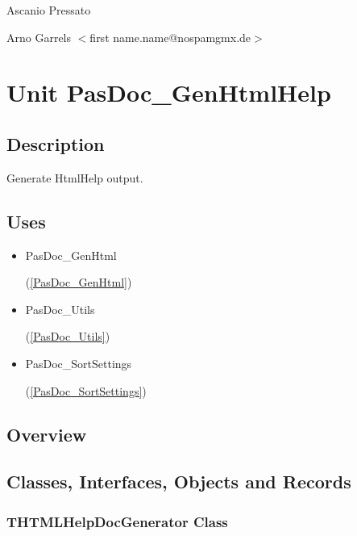 \documentclass{report}
\newif\ifpdf
\begin{document}
\par
Ascanio Pressato

\par
Arno Garrels {$<$}first name.name@nospamgmx.de{$>$}

\chapter{Unit PasDoc{\_}GenHtmlHelp}
\label{PasDoc_GenHtmlHelp}
\section{Description}
Generate HtmlHelp output.
\section{Uses}
\begin{itemize}
\item \begin{ttfamily}PasDoc{\_}GenHtml\end{ttfamily}(\ref{PasDoc_GenHtml})\item \begin{ttfamily}PasDoc{\_}Utils\end{ttfamily}(\ref{PasDoc_Utils})\item \begin{ttfamily}PasDoc{\_}SortSettings\end{ttfamily}(\ref{PasDoc_SortSettings})\end{itemize}
\section{Overview}
\begin{description}
\item[\texttt{\begin{ttfamily}THTMLHelpDocGenerator\end{ttfamily} Class}]
\end{description}
\section{Classes, Interfaces, Objects and Records}
\ifpdf
\subsection*{\large{\textbf{THTMLHelpDocGenerator Class}}\normalsize\hspace{1ex}\hrulefill}
\else
\subsection*{THTMLHelpDocGenerator Class}
\fi
\label{PasDoc_GenHtmlHelp.THTMLHelpDocGenerator}
\end{document}
